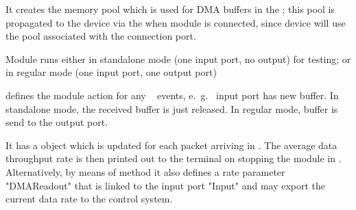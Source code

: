 \begin{compactenum} 
\item It creates the memory pool which is used for DMA buffers in the ; this pool is propagated to the device via the  when module is connected, since device will use the pool associated with the connection port.

\item Module runs either in standalone mode (one input port, no output) for testing; or in regular mode (one input port, one output port)

\item {} defines the module action for any \dabc~ events, 
e.~g.~ input port has new buffer. 
In standalone mode, the received buffer is just released. 
In regular mode, buffer is send to the output port.

\item It has a  object which is updated
for each packet arriving in . The average data 
throughput rate is then printed out to the terminal 
on stopping the module in .
Alternatively, by means of method 
it also defines a rate parameter "DMAReadout" that is linked to the
input port "Input" and may export the current data rate to the
control system.

 

\end{compactenum} 

